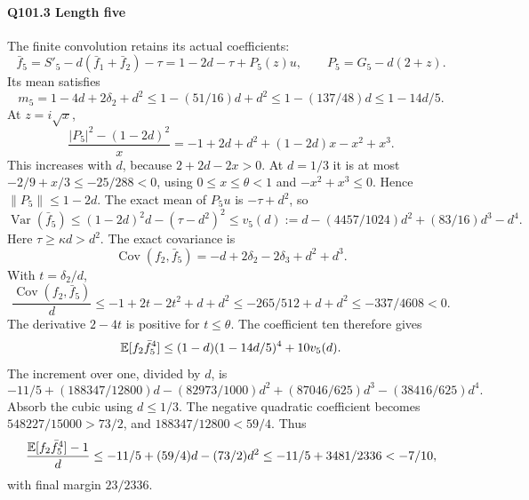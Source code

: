 \paragraph{Q101.3 Length five}\label{part:Q101.3}
The finite convolution retains its actual coefficients:
\[
 \bar f_5=S'_5-d(\bar f_1+\bar f_2)-\tau
 =1-2d-\tau+P_5(z)u,\qquad P_5=G_5-d(2+z).
\]
Its mean satisfies
\[
 m_5=1-4d+2\delta_2+d^2
 \le1-(51/16)d+d^2\le1-(137/48)d\le1-14d/5.
\]
At $z=\allowbreak i\sqrt x$,
\[
 \frac{|P_5|^2-(1-2d)^2}{x}
 =-1+2d+d^2+(1-2d)x-x^2+x^3.
\]
This increases with $d$, because $2+2d-2x>\allowbreak 0$.
At $d=\allowbreak 1/3$ it is at most $-2/9+x/3\le\allowbreak -25/288<\allowbreak 0$, using
$0\le\allowbreak  x\le\allowbreak \theta<\allowbreak 1$ and $-x^2+x^3\le\allowbreak 0$.
Hence $\|P_5\|\le\allowbreak 1-2d$.
The exact mean of $P_5u$ is $-\tau+d^2$, so
\[
 \operatorname{Var}(\bar f_5)\le(1-2d)^2d-(\tau-d^2)^2
 \le v_5(d):=d-(4457/1024)d^2+(83/16)d^3-d^4.
\]
Here $\tau\ge\allowbreak \kappa d>\allowbreak d^2$. The exact covariance is
\[
 \operatorname{Cov}(f_2,\bar f_5)=-d+2\delta_2-2\delta_3+d^2+d^3.
\]
With $t=\allowbreak \delta_2/d$,
\[
 \frac{\operatorname{Cov}(f_2,\bar f_5)}d
 \le-1+2t-2t^2+d+d^2
 \le-265/512+d+d^2\le-337/4608<0.
\]
The derivative $2-4t$ is positive for $t\le\allowbreak \theta$.
The coefficient ten therefore gives
\[
 \mathbb E[f_2\bar f_5^4]\le(1-d)(1-14d/5)^4+10v_5(d).
\]
The increment over one, divided by $d$, is
\[
 -11/5+(188347/12800)d-(82973/1000)d^2
 +(87046/625)d^3-(38416/625)d^4.
\]
Absorb the cubic using $d\le\allowbreak 1/3$. The negative quadratic coefficient
becomes $548227/15000>\allowbreak 73/2$, and $188347/12800<\allowbreak 59/4$. Thus
\[
 \frac{\mathbb E[f_2\bar f_5^4]-1}d
 \le-11/5+(59/4)d-(73/2)d^2
 \le-11/5+3481/2336<-7/10,
\]
with final margin $23/2336$.


